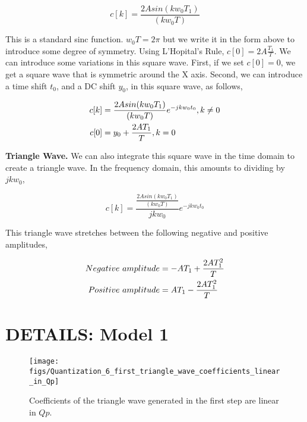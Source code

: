 \documentclass[12pt]{article}
\begin{document}
		\begin{equation}
		c[k] = \frac{2 A sin(kw_0T_1)}{(kw_0T)}
		\label{eq:Square_Wave_standard}
		\end{equation}
				
This is a standard sinc function.  $w_0T = 2\pi$ but we write it in the form above to introduce some degree of symmetry.  Using L'Hopital's Rule, $c[0]= 2A\frac{T_1}{T}$.  We can introduce some variations in this square wave.  First, if we set $c[0]=0$, we get a square wave that is symmetric around the X axis.  Second, we can introduce a time shift $t_0$, and a DC shift $y_0$, in this square wave, as follows,

		\begin{align}
		c[k] &= \frac{2 A sin(kw_0T_1)}{(kw_0T)}e^{-jkw_0t_0}, k\neq 0\notag\\
		c[0] &= y_0 + \frac{2AT_1}{T}, k=0 
		\label{eq:Square_Wave_shifted}
		\end{align}	

\textbf{Triangle Wave.}  We can also integrate this square wave in the time domain to create a triangle wave.  In the frequency domain, this amounts to dividing by $jkw_0$,

		\begin{equation}
		c[k] = \frac{\frac{2 A sin(kw_0T_1)}{(kw_0T)}}{jkw_0}e^{-jkw_0t_0}
		\label{eq:Shifted_Triangle_Wave}
		\end{equation}	
						
This triangle wave stretches between the following negative and positive amplitudes,

		\begin{align}
 		Negative \ amplitude &= -AT_1 + \frac{2AT_1^2}{T}\notag\\
 		Positive \ amplitude &= AT_1 - \frac{2AT_1^2}{T}
 		\label{eq:Triangle_Wave_Amplitudes}
 		\end{align}
 		
\section{DETAILS: Model 1}
		\begin{figure}[t]
		\centering				
		\texttt{[image: figs/Quantization\_6\_first\_triangle\_wave\_coefficients\_linear\_in\_Qp]}
		\caption{Coefficients of the triangle wave generated in the first step are linear in $Qp$.}
		\label{fig:Linear_in_Qp}
		\end{figure}
		
\end{document}
